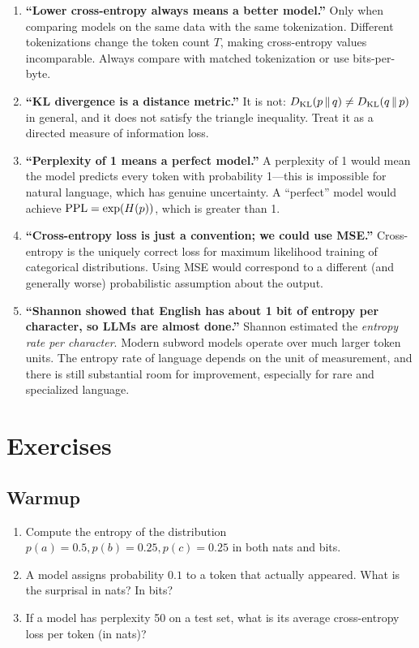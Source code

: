 \begin{enumerate}
  \item \textbf{``Lower cross-entropy always means a better model.''} Only when comparing models on the same data with the same tokenization. Different tokenizations change the token count $T$, making cross-entropy values incomparable. Always compare with matched tokenization or use bits-per-byte.

  \item \textbf{``KL divergence is a distance metric.''} It is not: $D_{\mathrm{KL}}\!\left(p \,\|\, q\right) \neq D_{\mathrm{KL}}\!\left(q \,\|\, p\right)$ in general, and it does not satisfy the triangle inequality. Treat it as a directed measure of information loss.

  \item \textbf{``Perplexity of 1 means a perfect model.''} A perplexity of 1 would mean the model predicts every token with probability 1---this is impossible for natural language, which has genuine uncertainty. A ``perfect'' model would achieve $\operatorname{PPL} = \exp(H(p))$, which is greater than 1.

  \item \textbf{``Cross-entropy loss is just a convention; we could use MSE.''} Cross-entropy is the uniquely correct loss for maximum likelihood training of categorical distributions. Using MSE would correspond to a different (and generally worse) probabilistic assumption about the output.

  \item \textbf{``Shannon showed that English has about 1 bit of entropy per character, so LLMs are almost done.''} Shannon estimated the \emph{entropy rate per character}. Modern subword models operate over much larger token units. The entropy rate of language depends on the unit of measurement, and there is still substantial room for improvement, especially for rare and specialized language.
\end{enumerate}


\section{Exercises}
\label{ch:01:sec:exercises}

\subsection*{Warmup}
\begin{enumerate}
  \item Compute the entropy of the distribution $p(a) = 0.5, p(b) = 0.25, p(c) = 0.25$ in both nats and bits.

  \item A model assigns probability $0.1$ to a token that actually appeared. What is the surprisal in nats? In bits?

  \item If a model has perplexity 50 on a test set, what is its average cross-entropy loss per token (in nats)?
\end{enumerate}

